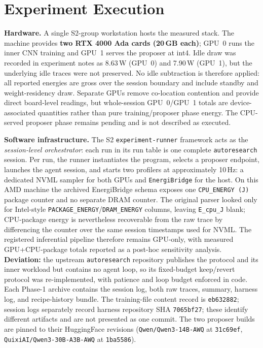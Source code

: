 \section{Experiment Execution}\label{sec:execution}

\textbf{Hardware.} A single S2-group workstation hosts the measured stack. The machine provides \textbf{two RTX 4000 Ada cards (20\,GB each)}; GPU~0 runs the inner CNN training and GPU~1 serves the proposer at int4. Idle draw was recorded in experiment notes as 8.63\,W (GPU~0) and 7.90\,W (GPU~1), but the underlying idle traces were not preserved. No idle subtraction is therefore applied: all reported energies are gross over the session boundary and include standby and weight-residency draw. Separate GPUs remove co-location contention and provide direct board-level readings, but whole-session GPU~0/GPU~1 totals are device-associated quantities rather than pure training/proposer phase energy. The CPU-served proposer phase remains pending and is not described as executed.

\textbf{Software infrastructure.} The S2 \texttt{experiment-runner} framework \cite{karsten2025experimentrunner} acts as the \emph{session-level orchestrator}: each run in its run table is one complete \texttt{autoresearch} session. Per run, the runner instantiates the program, selects a proposer endpoint, launches the agent session, and starts two profilers at approximately 10\,Hz: a dedicated NVML sampler for both GPUs and \texttt{EnergiBridge} \cite{sallou2023energibridge} for the host. On this AMD machine the archived EnergiBridge schema exposes one \texttt{CPU\_ENERGY (J)} package counter and no separate DRAM counter. The original parser looked only for Intel-style \texttt{PACKAGE\_ENERGY}/\texttt{DRAM\_ENERGY} columns, leaving \texttt{E\_cpu\_J} blank; CPU-package energy is nevertheless recoverable from the raw trace by differencing the counter over the same session timestamps used for NVML. The registered inferential pipeline therefore remains GPU-only, with measured GPU+CPU-package totals reported as a post-hoc sensitivity analysis. \textbf{Deviation:} the upstream \texttt{autoresearch} repository publishes the protocol and its inner workload but contains no agent loop, so its fixed-budget keep/revert protocol was re-implemented, with patience and loop budget enforced in code. Each Phase-1 archive contains the session log, both raw traces, summary, harness log, and recipe-history bundle. The training-file content record is \texttt{eb632882}; session logs separately record harness repository SHA \texttt{7065bf27}; these identify different artifacts and are not presented as one commit. The two proposer builds are pinned to their HuggingFace revisions (\texttt{Qwen/Qwen3-14B-AWQ} at \texttt{31c69ef}, \texttt{QuixiAI/Qwen3-30B-A3B-AWQ} at \texttt{1ba5586}).

